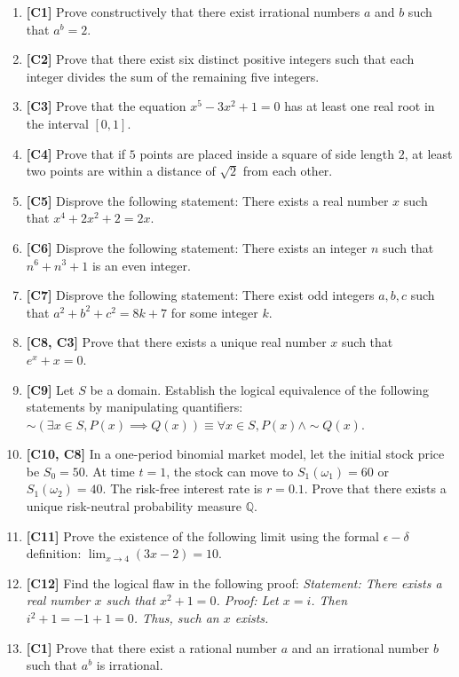 \documentclass[11pt]{article}
\begin{document}
\begin{enumerate}
    \item \textbf{[C1]} Prove constructively that there exist irrational numbers $a$ and $b$ such that $a^b = 2$. 
    \item \textbf{[C2]} Prove that there exist six distinct positive integers such that each integer divides the sum of the remaining five integers.
    \item \textbf{[C3]} Prove that the equation $x^5 - 3x^2 + 1 = 0$ has at least one real root in the interval $[0, 1]$.
    \item \textbf{[C4]} Prove that if $5$ points are placed inside a square of side length $2$, at least two points are within a distance of $\sqrt{2}$ from each other.
    \item \textbf{[C5]} Disprove the following statement: There exists a real number $x$ such that $x^4 + 2x^2 + 2 = 2x$.
    \item \textbf{[C6]} Disprove the following statement: There exists an integer $n$ such that $n^6 + n^3 + 1$ is an even integer.
    \item \textbf{[C7]} Disprove the following statement: There exist odd integers $a, b, c$ such that $a^2 + b^2 + c^2 = 8k + 7$ for some integer $k$.
    \item \textbf{[C8, C3]} Prove that there exists a unique real number $x$ such that $e^x + x = 0$.
    \item \textbf{[C9]} Let $S$ be a domain. Establish the logical equivalence of the following statements by manipulating quantifiers: $\sim(\exists x \in S, P(x) \implies Q(x)) \equiv \forall x \in S, P(x) \land \sim Q(x)$.
    \item \textbf{[C10, C8]} In a one-period binomial market model, let the initial stock price be $S_0 = 50$. At time $t=1$, the stock can move to $S_1(\omega_1) = 60$ or $S_1(\omega_2) = 40$. The risk-free interest rate is $r = 0.1$. Prove that there exists a unique risk-neutral probability measure $\mathbb{Q}$.
    \item \textbf{[C11]} Prove the existence of the following limit using the formal $\epsilon-\delta$ definition: $\lim_{x \to 4} (3x - 2) = 10$.
    \item \textbf{[C12]} Find the logical flaw in the following proof: \textit{Statement: There exists a real number $x$ such that $x^2 + 1 = 0$. Proof: Let $x = i$. Then $i^2 + 1 = -1 + 1 = 0$. Thus, such an $x$ exists.}
    \item \textbf{[C1]} Prove that there exist a rational number $a$ and an irrational number $b$ such that $a^b$ is irrational.

\end{enumerate}
\end{document}
